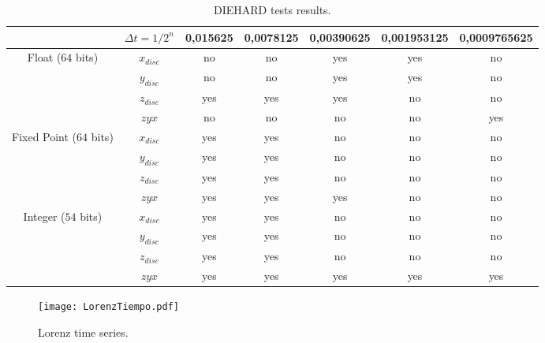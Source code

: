 \begin{table*} [tb]
\begin{center}
\caption{DIEHARD tests results.}
\begin{tabular}{|c|c|c|c|c|c|c|}
\hline\hline
              & $\Delta t=1/2^n$ & 0,015625 & 0,0078125   & 0,00390625  & 0,001953125  & 0,0009765625       \\
\hline\hline
Float ($64$ bits)    &$x_{disc}$             & no           & no                & yes         & yes &no  \\
\hline
                   &$y_{disc}$             &no            & no               & yes         &yes  &  no \\
\hline
                  &$z_{disc}$            &yes            &yes                 &yes          &no &  no\\
\hline
                 &$zyx$             & no            &  no                &   no        & no &  yes \\
\hline\hline
Fixed Point  ($64$ bits)
               &$x_{disc}$             &yes           & yes             &no          & no  &no    \\
\hline
                   &$y_{disc}$        &yes           & yes             &no          & no  &no    \\
\hline
                   &$z_{disc}$         &yes           & yes             &no          & no  &no    \\
\hline
                   &$zyx$            &yes           & yes             &yes          & no  &no    \\
\hline\hline
Integer ($54$ bits) &$x_{disc}$         &yes           & yes             &no          & no  &no    \\
\hline
                   &$y_{disc}$       &yes           & yes             &no          & no  &no    \\
\hline
                   &$z_{disc}$         &yes           & yes             &no          & no  &no    \\
\hline
                   &$zyx$       &yes           &yes             &yes          &yes &yes  \\
\hline
\end{tabular}\end{center}
\label{tabla:Tabla2}
\end{table*}


\begin{figure}
    \centering
    \texttt{[image: LorenzTiempo.pdf]}\\
    \caption{Lorenz time series.}\label{fig:tiempo}
\end{figure}

